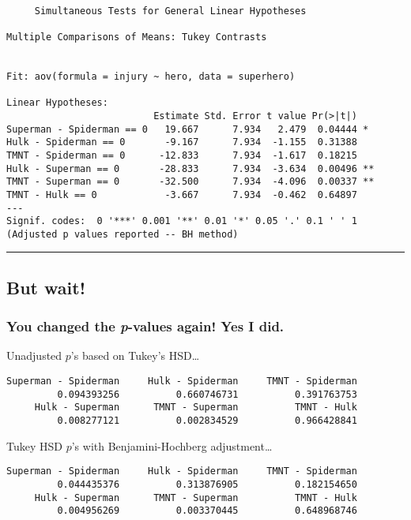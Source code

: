\documentclass[]{article}
\begin{document}
\begin{verbatim}

     Simultaneous Tests for General Linear Hypotheses

Multiple Comparisons of Means: Tukey Contrasts


Fit: aov(formula = injury ~ hero, data = superhero)

Linear Hypotheses:
                          Estimate Std. Error t value Pr(>|t|)   
Superman - Spiderman == 0   19.667      7.934   2.479  0.04444 * 
Hulk - Spiderman == 0       -9.167      7.934  -1.155  0.31388   
TMNT - Spiderman == 0      -12.833      7.934  -1.617  0.18215   
Hulk - Superman == 0       -28.833      7.934  -3.634  0.00496 **
TMNT - Superman == 0       -32.500      7.934  -4.096  0.00337 **
TMNT - Hulk == 0            -3.667      7.934  -0.462  0.64897   
---
Signif. codes:  0 '***' 0.001 '**' 0.01 '*' 0.05 '.' 0.1 ' ' 1
(Adjusted p values reported -- BH method)
\end{verbatim}

\begin{center}\rule{0.5\linewidth}{\linethickness}\end{center}

\hypertarget{but-wait-1}{%
\subsection{But wait!}\label{but-wait-1}}

\hypertarget{you-changed-the-p-values-again-yes-i-did.}{%
\subsubsection{\texorpdfstring{You changed the \emph{p}-values again!
Yes I
did.}{You changed the p-values again! Yes I did.}}\label{you-changed-the-p-values-again-yes-i-did.}}

Unadjusted \(p\)'s based on Tukey's HSD\ldots{}

\begin{verbatim}
Superman - Spiderman     Hulk - Spiderman     TMNT - Spiderman 
         0.094393256          0.660746731          0.391763753 
     Hulk - Superman      TMNT - Superman          TMNT - Hulk 
         0.008277121          0.002834529          0.966428841 
\end{verbatim}

Tukey HSD \(p\)'s with Benjamini-Hochberg adjustment\ldots{}

\begin{verbatim}
Superman - Spiderman     Hulk - Spiderman     TMNT - Spiderman 
         0.044435376          0.313876905          0.182154650 
     Hulk - Superman      TMNT - Superman          TMNT - Hulk 
         0.004956269          0.003370445          0.648968746 
\end{verbatim}
\end{document}

